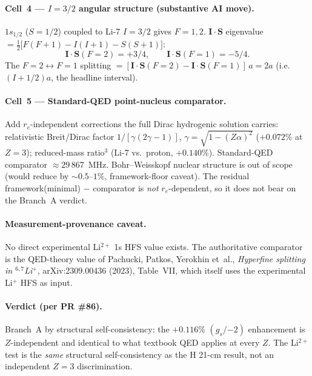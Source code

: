 \paragraph{Cell~4 --- $I = 3/2$ angular structure (substantive AI move).}
$1s_{1/2}$ ($S=1/2$) coupled to Li-7 $I = 3/2$ gives $F = 1, 2$.
$\mathbf{I}\!\cdot\!\mathbf{S}$ eigenvalue
$= \tfrac{1}{2}\bigl[F(F+1) - I(I+1) - S(S+1)\bigr]$:
\[
\mathbf{I}\!\cdot\!\mathbf{S}(F=2) = +3/4, \qquad
\mathbf{I}\!\cdot\!\mathbf{S}(F=1) = -5/4.
\]
The $F=2 \leftrightarrow F=1$ splitting
$= [\mathbf{I}\!\cdot\!\mathbf{S}(F=2) - \mathbf{I}\!\cdot\!\mathbf{S}(F=1)]\,a
= 2a$ (i.e.~$(I + 1/2) a$, the headline interval).

\paragraph{Cell~5 --- Standard-QED point-nucleus comparator.}
Add $r_e$-independent corrections the full Dirac hydrogenic solution carries:
relativistic Breit/Dirac factor $1/[\gamma(2\gamma - 1)]$, $\gamma =
\sqrt{1 - (Z\alpha)^2}$ ($+0.072\%$ at $Z=3$); reduced-mass ratio${}^3$
(Li-7 vs.~proton, $+0.140\%$). Standard-QED comparator
$\approx 29\,867$~MHz. Bohr--Weisskopf nuclear structure is out of scope
(would reduce by $\sim 0.5$--$1\%$, framework-floor caveat).
The residual framework(minimal) $-$ comparator is \emph{not} $r_e$-dependent,
so it does not bear on the Branch~A verdict.

\paragraph{Measurement-provenance caveat.}
No direct experimental Li$^{2+}$ 1s HFS value exists. The authoritative
comparator is the QED-theory value of Pachucki, Patkos, Yerokhin et~al.,
\emph{Hyperfine splitting in $^{6,7}$Li$^+$}, arXiv:2309.00436 (2023),
Table~VII, which itself uses the experimental Li$^+$ HFS as input.

\paragraph{Verdict (per PR \#86).}
Branch~A by structural self-consistency: the $+0.116\%$ $(g_s/{-2})$
enhancement is $Z$-independent and identical to what textbook QED applies at
every $Z$. The Li$^{2+}$ test is the \emph{same} structural self-consistency
as the H 21-cm result, not an independent $Z=3$ discrimination.

